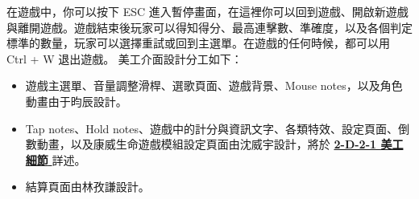 \documentclass[a4paper,12pt]{article}
\begin{document}
在遊戲中，你可以按下 ESC 進入暫停畫面，在這裡你可以回到遊戲、開啟新遊戲與離開遊戲。遊戲結束後玩家可以得知得分、最高連擊數、準確度，以及各個判定標準的數量，玩家可以選擇重試或回到主選單。在遊戲的任何時候，都可以用 Ctrl + W 退出遊戲。
美工介面設計分工如下：
\begin{itemize}
\item 遊戲主選單、音量調整滑桿、選歌頁面、遊戲背景、Mouse notes，以及角色動畫由于昀辰設計。
\item Tap notes、Hold notes、遊戲中的計分與資訊文字、各類特效、設定頁面、倒數動畫，以及康威生命遊戲模組設定頁面由沈威宇設計，將於 \hyperref[2-D-2-1]{\textbf{2-D-2-1 美⼯細節}
\label{2-D-2-1}} 詳述。
\item 結算頁面由林孜謙設計。
\end{itemize}
\end{document}
